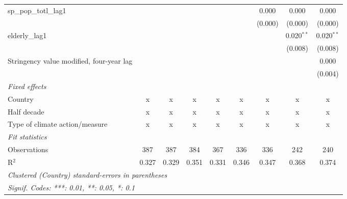 \begin{tabular}{lcccccccc}
   sp\_pop\_totl\_lag1                                 &         &         &               &               &         & 0.000   & 0.000        & 0.000\\   
                                                       &         &         &               &               &         & (0.000) & (0.000)      & (0.000)\\   
   elderly\_lag1                                       &         &         &               &               &         &         & 0.020$^{**}$ & 0.020$^{**}$\\   
                                                       &         &         &               &               &         &         & (0.008)      & (0.008)\\   
   Stringency value modified, four-year lag            &         &         &               &               &         &         &              & 0.000\\   
                                                       &         &         &               &               &         &         &              & (0.004)\\   
   \emph{Fixed effects}\\
   Country                                             & x       & x       & x             & x             & x       & x       & x            & x\\  
   Half decade                                         & x       & x       & x             & x             & x       & x       & x            & x\\  
   Type of climate action/measure                      & x       & x       & x             & x             & x       & x       & x            & x\\  
   \midrule \emph{Fit statistics}\\
   Observations                                        & 387     & 387     & 384           & 367           & 336     & 336     & 242          & 240\\  
   R$^2$                                               & 0.327   & 0.329   & 0.351         & 0.331         & 0.346   & 0.347   & 0.368        & 0.374\\  
   \midrule
   \multicolumn{9}{l}{\emph{Clustered (Country) standard-errors in parentheses}}\\
   \multicolumn{9}{l}{\emph{Signif. Codes: ***: 0.01, **: 0.05, *: 0.1}}\\
\end{tabular}
\par\endgroup


